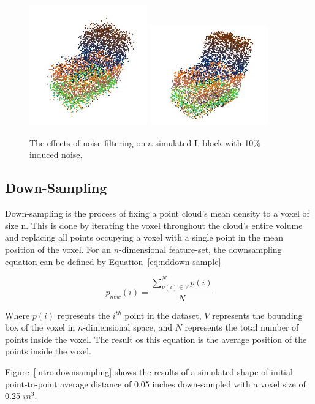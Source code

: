 \documentclass[12pt]{drexelthesis}
\let\Oldsubsection\subsection
\renewcommand{\subsection}{\FloatBarrier\Oldsubsection}
\begin{document}
\begin{figure}[!ht]
	\centering
		\includegraphics[width=2in]{l_block_pt_cloud10pnoise.jpg} \includegraphics[width=2in]{l_block_pt_cloud10pnoiseFILTEREDk100std05.jpg}
	\caption[Effects of noise filter on simulated point cloud objects]{\centering The effects of noise filtering on a simulated L block with 10\% induced noise.}
\end{figure}


\subsection{Down-Sampling}
Down-sampling is the process of fixing a point cloud’s mean density to a voxel of size n. This is done by iterating the voxel throughout the cloud’s entire volume and replacing all points occupying a voxel with a single point in the mean position of the voxel. For an $n$-dimensional feature-set, the downsampling equation can be defined by Equation~\ref{eq:nddown-sample}

\begin{equation}
	\label{eq:nddown-sample}
	p_{new} (i) = \frac {\sum_{p(i) \in V}^{N} p(i) }  {N}
\end{equation}

Where $p(i)$ represents the $i^{th}$ point in the dataset, $V$ represents the bounding box of the voxel in $n$-dimensional space, and $N$ represents the total number of points inside the voxel. The result os this equation is the average position of the points inside the voxel.

Figure~\ref{intro:downsampling} shows the results of a simulated shape of initial point-to-point average distance of 0.05 inches down-sampled with a voxel size of 0.25 $in^{3}$.
\end{document}
